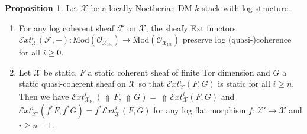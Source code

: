 \documentclass[11pt]{amsart}
\theoremstyle{definition}
\theoremstyle{definition}
\newtheorem{proposition}[theorem]{Proposition}
\DeclareMathOperator{\arrowup}{\!\Uparrow \!}
\begin{document}
\begin{proposition}\label{prop: ext}
    Let $\mathcal{X}$ be a locally Noetherian DM $k$-stack with log structure.
    \begin{enumerate}
        \item\label{item: sheafy Ext is qcoh} For any log coherent sheaf $\mathcal{F}$ on $\mathcal{X}$, the sheafy Ext functors $\mathcal{E}xt^{i}_{\mathcal{X}}(\mathcal{F},-)\colon \text{Mod}(\mathcal{O}_{\mathcal{X}_\text{l\'et}})\rightarrow \text{Mod}(\mathcal{O}_{\mathcal{X}_\text{l\'et}})$ preserve log (quasi-)coherence for all $i\geq 0$.
        \item\label{item: how to compute sheafy Ext} Let $\mathcal{X}$ be static, $F$ a static coherent sheaf of finite Tor dimension and $G$ a static quasi-coherent sheaf on $\mathcal{X}$ so that $\mathcal{E}xt^{i}_{\underline{\mathcal{X}}}(F,G)$ is static for all $i\geq n$. Then we have $\mathcal{E}xt^{i}_{\mathcal{X}_{\text{l\'et}}}(\arrowup F,\arrowup G) = \arrowup \mathcal{E}xt^{i}_{\underline{\mathcal{X}}}(F,G)$ and $\mathcal{E}xt^{i}_{\underline{\mathcal{X}}'}(\underline{f}^* F,\underline{f}^* G) = \underline{f}^* \mathcal{E}xt^{i}_{\underline{\mathcal{X}}}(F,G)$ for any log flat morphism $f\colon \mathcal{X}'\rightarrow\mathcal{X}$ and $i\geq n-1$.
    \end{enumerate}
\end{proposition}
\end{document}

